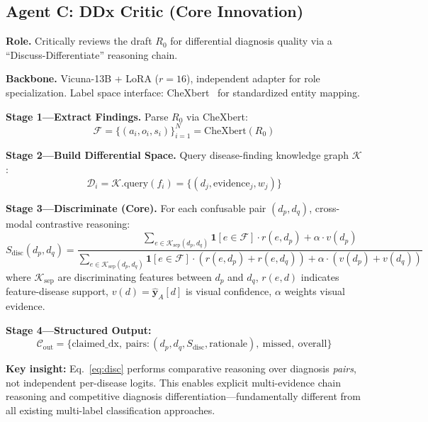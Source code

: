 \documentclass[runningheads,10pt]{llncs}
\newcommand{\yhat}{\hat{\mathbf{y}}}
\newcommand{\Stotal}{S_{\text{disc}}}
\newcommand{\Ksep}{\mathcal{K}_{\text{sep}}}
\newcommand{\Cout}{\mathcal{C}_{\text{out}}}
\begin{document}
\subsection{Agent C: DDx Critic (Core Innovation)}

\textbf{Role.} Critically reviews the draft $R_0$ for differential diagnosis quality via a ``Discuss-Differentiate'' reasoning chain.

\textbf{Backbone.} Vicuna-13B + LoRA ($r=16$), independent adapter for role specialization. Label space interface: CheXbert~\cite{chexpert} for standardized entity mapping.

\textbf{Stage 1---Extract Findings.} Parse $R_0$ via CheXbert:
\begin{equation}
\mathcal{F} = \{ (a_i, o_i, s_i) \}_{i=1}^{N} = \text{CheXbert}(R_0) \label{eq:extract}
\end{equation}

\textbf{Stage 2---Build Differential Space.} Query disease-finding knowledge graph $\mathcal{K}$:
\begin{equation}
\mathcal{D}_i = \mathcal{K}.\text{query}(f_i) = \{ (d_j, \text{evidence}_j, w_j) \} \label{eq:diffspace}
\end{equation}

\textbf{Stage 3---Discriminate (Core).} For each confusable pair $(d_p, d_q)$, cross-modal contrastive reasoning:
\begin{equation}
\boxed{
\Stotal(d_p, d_q) = \frac{
    \sum_{e \in \Ksep(d_p, d_q)} \mathbf{1}[e \in \mathcal{F}] \cdot r(e, d_p)
    + \alpha \cdot v(d_p)
}{
    \sum_{e \in \Ksep(d_p, d_q)} \mathbf{1}[e \in \mathcal{F}] \cdot (r(e, d_p) + r(e, d_q))
    + \alpha \cdot (v(d_p) + v(d_q))
}
} \label{eq:disc}
\end{equation}
where $\Ksep$ are discriminating features between $d_p$ and $d_q$, $r(e,d)$ indicates feature-disease support, $v(d)=\yhat_A[d]$ is visual confidence, $\alpha$ weights visual evidence.

\textbf{Stage 4---Structured Output:}
\begin{equation}
\Cout = \{\text{claimed\_dx},\ \text{pairs}: (d_p,d_q,\Stotal,\text{rationale}),\ \text{missed},\ \text{overall}\} \label{eq:ddxout}
\end{equation}

\textbf{Key insight:} Eq.~\eqref{eq:disc} performs comparative reasoning over diagnosis \emph{pairs}, not independent per-disease logits. This enables explicit multi-evidence chain reasoning and competitive diagnosis differentiation---fundamentally different from all existing multi-label classification approaches.
\end{document}
